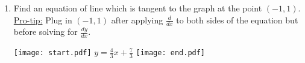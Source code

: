 \documentclass[12pt]{article}
\begin{document}
\begin{enumerate}
\begin{enumerate}
\item Find an equation of line which is tangent to the graph at the point $(-1,1)$.\\
\underline{Pro-tip:} Plug in $(-1,1)$ after applying $\frac{d}{dx}$ to both sides of the equation but before solving for $\frac{dy}{dx}$.

\texttt{[image: start.pdf]}
{{$y=\frac{4}{3}x+\frac{7}{3}$}}
\texttt{[image: end.pdf]}


\end{enumerate}

\end{enumerate}
\end{document}
